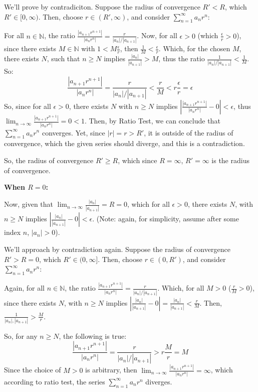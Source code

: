 \documentclass{article}
\begin{document}
\hfill

We'll prove by contradiciton. Suppose the radius of convergence $R'<R$, which $R'\in[0,\infty)$. 
Then, choose $r\in(R',\infty)$, and consider $\sum_{n=1}^{\infty}a_nr^n$:

For all $n\in\mathbb{N}$, the ratio $\frac{|a_{n+1}r^{n+1}|}{|a_nr^n|}=\frac{r}{|a_n|/|a_{n+1}|}$. Now, for all $\epsilon>0$ (which $\frac{\epsilon}{r}>0$), since there exists $M\in\mathbb{N}$ with $1<M\frac{\epsilon}{r}$,
then $\frac{1}{M}<\frac{\epsilon}{r}$. Which, for the chosen $M$, there exists $N$, such that $n\geq N$ implies $\frac{|a_n|}{|a_{n+1}|}>M$, thus the ratio $\frac{1}{|a_n|/|a_{n+1}|}<\frac{1}{M}$. So:
$$\frac{|a_{n+1}r^{n+1}|}{|a_nr^n|}=\frac{r}{|a_n|/|a_{n+1}|}<\frac{r}{M} < r\frac{\epsilon}{r}=\epsilon$$
So, since for all $\epsilon>0$, there exists $N$ with $n\geq N$ implies $\left|\frac{|a_{n+1}r^{n+1}|}{|a_nr^n|}-0\right|<\epsilon$, thus $\lim_{n\rightarrow\infty}\frac{|a_{n+1}r^{n+1}|}{|a_nr^n|}=0<1$.
Then, by Ratio Test, we can conclude that $\sum_{n=1}^{\infty}a_nr^n$ converges.  Yet, since $|r|=r>R'$, it is outside of the radius of convergence,
which the given series should diverge, and this is a contradiction.

So, the radius of convergence $R'\geq R$, which since $R=\infty$, $R'=\infty$ is the radius of convergence.

\hfill

\hfill

\hfill

\textbf{When $R=0$:}

Now, given that $\lim_{n\rightarrow\infty}\frac{|a_{n}|}{|a_{n+1}|}=R=0$, which for all $\epsilon>0$, there exists $N$, with $n\geq N$ implies $\left|\frac{|a_n|}{|a_{n+1}|}-0\right|<\epsilon$.
(Note: again, for simplicity, assume after some index $n$, $|a_n|>0$).

\hfill

We'll approach by contradiction again. Suppose the radius of convergence $R'>R=0$, which $R'\in(0,\infty]$.
Then, choose $r\in (0,R')$, and consider $\sum_{n=1}^{\infty}a_nr^n$:

Again, for all $n\in\mathbb{N}$, the ratio $\frac{|a_{n+1}r^{n+1}|}{|a_nr^n|}=\frac{r}{|a_n|/|a_{n+1}|}$. Which, for all $M>0$ ($\frac{r}{M}>0$), since there exists $N$,
with $n\geq N$ implies $\left|\frac{|a_n|}{|a_{n+1}|}-0\right|=\frac{|a_n|}{|a_{n+1}|}<\frac{r}{M}$. Then, $\frac{1}{|a_n|,|a_{n+1}|}>\frac{M}{r}$.

So, for any $n\geq N$, the following is true:
$$\frac{|a_{n+1}r^{n+1}|}{|a_nr^n|}=\frac{r}{|a_n|/|a_{n+1}|} > r\frac{M}{r}=M$$
Since the choice of $M>0$ is arbitrary, then $\lim_{n\rightarrow\infty}\frac{|a_{n+1}r^{n+1}|}{|a_nr^n|}=\infty$, which according to ratio test, the series $\sum_{n=1}^{\infty}a_nr^n$ diverges.
\end{document}
